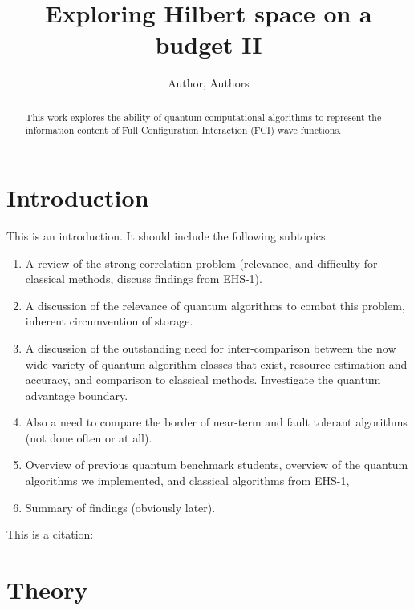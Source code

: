 \documentclass[aip,jcp,amsmath,amssymb, reprint]{revtex4-1}
\begin{document}
\title{Exploring Hilbert space on a budget II}
\author{Author, Authors}

\begin{abstract}
This work explores the ability of quantum computational algorithms to represent the information content of Full Configuration Interaction (FCI) wave functions.

\end{abstract}

\linenumbersep=24pt

\maketitle

\section{\label{sec:intro}Introduction}

This is an introduction. It should include the following subtopics:

\begin{enumerate}
\item A review of the strong correlation problem (relevance, and difficulty for classical methods, discuss findings from EHS-1).
\item A discussion of the relevance of quantum algorithms to combat this problem, inherent circumvention of storage.
\item A discussion of the outstanding need for inter-comparison between the now wide variety of quantum algorithm classes that exist, resource estimation and accuracy, and comparison to classical methods. Investigate the quantum advantage boundary.
\item Also a need to compare the border of near-term and fault tolerant algorithms (not done often or at all).
\item Overview of previous quantum benchmark students, overview of the quantum algorithms we implemented, and classical algorithms from EHS-1,
\item Summary of findings (obviously later).
\end{enumerate}

This is a citation: \cite{Schriber2016Adaptive}

\section{\label{sec:theory}Theory}
\end{document}
